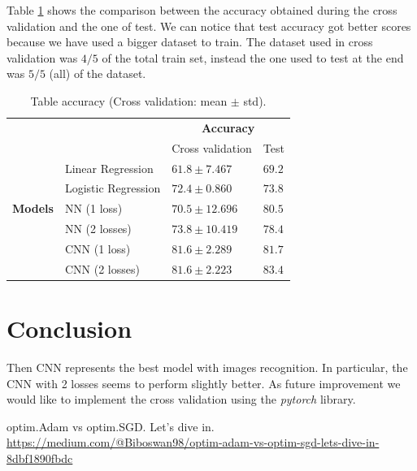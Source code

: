 \documentclass[journal, a4paper]{IEEEtran}
\begin{document}
Table \ref{table:accuracy} shows the comparison between the accuracy obtained during the cross validation and the one of test. We can notice that test accuracy got better scores because we have used a bigger dataset to train. The dataset used in cross validation was $4/5$ of the total train set, instead the one used to test at the end was $5/5$ (all) of the dataset.
\begin{table}
\centering
\caption{Table accuracy (Cross validation: mean $\pm$ std).}
\label{table:accuracy}
\begin{tabular}{|l|l|l|l|} 
\cline{3-4}
\multicolumn{1}{l}{} &                     & \multicolumn{2}{c|}{\textbf{Accuracy}}  \\ 
\cline{3-4}
\multicolumn{1}{l}{} &                     & Cross validation & Test                 \\ 
\hline
                     & Linear Regression   & $61.8\pm7.467$    & $69.2$                 \\ 
\cline{2-4}
     & Logistic Regression & $72.4 \pm0.860$    & $73.8$                 \\ 
\cline{2-4}
\textbf{Models}    & NN (1 loss)~        & $70.5 \pm12.696$   & $80.5$                 \\ 
\cline{2-4}
                     & NN (2 losses)~      & $73.8 \pm10.419$   & $78.4$                 \\ 
\cline{2-4}
                     & CNN (1 loss)~       & $81.6 \pm2.289$    & $81.7$                 \\ 
\cline{2-4}
                     & CNN (2 losses)      & $81.6 \pm2.223$    & $83.4$                 \\
\hline
\end{tabular}
\end{table}

\section{Conclusion}
\label{sec:conclusion}
Then CNN represents the best model with images recognition. In particular, the CNN with 2 losses seems to perform slightly better. 
As future improvement we would like to implement the cross validation using the \textit{pytorch} library.




\begin{thebibliography}{999}

    	optim.Adam vs optim.SGD. Let’s dive in.
    	\url{https://medium.com/@Biboswan98/optim-adam-vs-optim-sgd-lets-dive-in-8dbf1890fbdc}
	
	    

\end{thebibliography}

\end{document}
